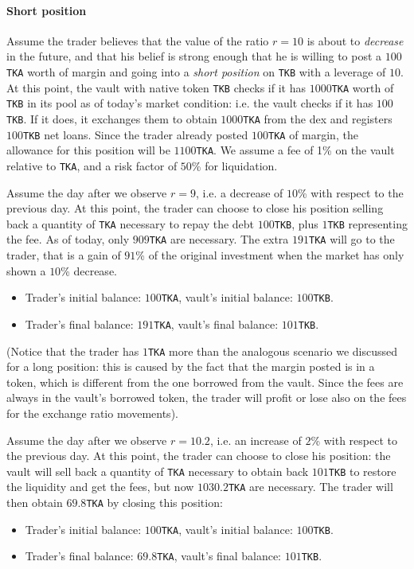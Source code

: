 \documentclass[a4paper,10 pt]{article}
\theoremstyle{definition}
\begin{document}
\paragraph{Short position}

Assume the trader believes that the value of the ratio $r = 10$ is about to \emph{decrease} in the future, and that his belief is strong enough that he is willing to post a $100$\verb|TKA| worth of margin and going into a \emph{short position} on \verb|TKB| with a leverage of $10$. At this point, the vault with native token \verb|TKB| checks if it has $1000$\verb|TKA| worth of \verb|TKB| in its pool as of today's market condition: i.e. the vault checks if it has $100$\verb|TKB|. If it does, it exchanges them to obtain $1000$\verb|TKA| from the dex and registers $100$\verb|TKB| net loans. Since the trader already posted $100$\verb|TKA| of margin, the allowance for this position will be $1100$\verb|TKA|. We assume a fee of 1\% on the vault relative to \verb|TKA|, and a risk factor of $50$\% for liquidation.

Assume the day after we observe $r = 9$, i.e. a decrease of $10$\% with respect to the previous day. At this point, the trader can choose to close his position selling back a quantity of \verb|TKA| necessary to repay the debt $100$\verb|TKB|, plus $1$\verb|TKB| representing the fee. As of today, only $909$\verb|TKA| are necessary. The extra $191$\verb|TKA| will go to the trader, that is a gain of $91$\% of the original investment when the market has only shown a $10$\% decrease. 
\begin{itemize}
    \item Trader's initial balance: $100$\verb|TKA|, vault's initial balance: $100$\verb|TKB|.
    \item Trader's final balance: $191$\verb|TKA|, vault's final balance: $101$\verb|TKB|.
\end{itemize}
(Notice that the trader has $1$\verb|TKA| more than the analogous scenario we discussed for a long position: this is caused by the fact that the margin posted is in a token, which is different from the one borrowed from the vault. Since the fees are always in the vault's borrowed token, the trader will profit or lose also on the fees for the exchange ratio movements).

Assume the day after we observe $r = 10.2$, i.e. an increase of $2$\% with respect to the previous day.  At this point, the trader can choose to close his position: the vault will sell back a quantity of \verb|TKA| necessary to obtain back $101$\verb|TKB| to restore the liquidity and get the fees, but now $1030.2$\verb|TKA| are necessary. The trader will then obtain $69.8$\verb|TKA| by closing this position:
\begin{itemize}
    \item Trader's initial balance: $100$\verb|TKA|, vault's initial balance: $100$\verb|TKB|.
    \item Trader's final balance: $69.8$\verb|TKA|, vault's final balance: $101$\verb|TKB|.
\end{itemize}
\end{document}
